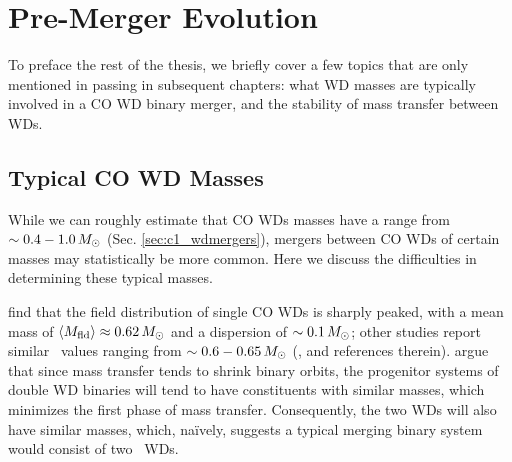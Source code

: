 \section{Pre-Merger Evolution}


To preface the rest of the thesis, we briefly cover a few topics that are only mentioned in passing in subsequent chapters: what WD masses are typically involved in a CO WD binary merger, and the stability of mass transfer between WDs.

\subsection{Typical CO WD Masses}
\label{ssec:c1_cowd_massrange}

While we can roughly estimate that CO WDs masses have a range from $\sim0.4 - 1.0\,\Msun$ (Sec. \ref{sec:c1_wdmergers}), mergers between CO WDs of certain masses may statistically be more common.  Here we discuss the difficulties in determining these typical masses.


\cite{trem+16} find that the field distribution of single CO WDs is sharply peaked, with a mean mass of $\Mmean \approx 0.62\,\Msun$ and a dispersion of $\sim0.1\,\Msun$; other studies report similar \Mmean\ values ranging from $\sim0.6 - 0.65\,\Msun$ (\citealt{klei+13}, and references therein).  \citeal{vkercj10} argue that since mass transfer tends to shrink binary orbits, the progenitor systems of double WD binaries will tend to have constituents with similar masses, which minimizes the first phase of mass transfer.  Consequently, the two WDs will also have similar masses, which, na\"{i}vely, suggests a typical merging binary system would consist of two \Mmean\ WDs.


